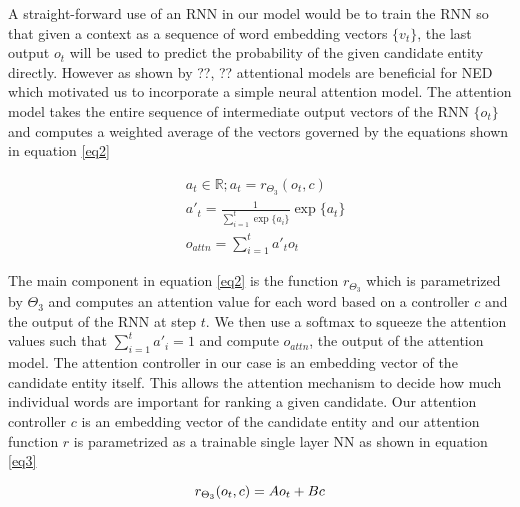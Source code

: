 \documentclass[11pt]{article}
\begin{document}
A straight-forward use of an RNN in our model would be to train the RNN so that given a context as a sequence of word embedding vectors $\{v_t\}$, the last output $o_t$ will be used to predict the probability of the given candidate entity directly. However as shown by ??, ?? attentional models are beneficial for NED which motivated us to incorporate a simple neural attention model. The attention model takes the entire sequence of intermediate output vectors of the RNN $\{o_t\}$ and computes a weighted average of the vectors governed by the equations shown in equation \ref{eq2}

\begin{equation}
	\label{eq2}
	\begin{aligned}
	& a_t \in \mathbb{R}; a_t=r_{\Theta_3}(o_t, c) \\
	& a'_t  = \frac{1}{\sum_{i=1}^{t} \exp\{a_i\}} \exp \{a_t\} \\
	& o_{attn}=\sum_{i=1}^{t} a'_t o_t
	\end{aligned}
\end{equation}

The main component in equation \ref{eq2} is the function $r_{\Theta_3}$ which is parametrized by $\Theta_3$ and computes an attention value for each word based on a controller $c$ and the output of the RNN at step $t$. We then use a softmax to squeeze the attention values such that $\sum_{i=1}^{t} a'_i = 1$ and compute $o_{attn}$, the output of the attention model. The attention controller in our case is an embedding vector of the candidate entity itself. This allows the attention mechanism to decide how much individual words are important for ranking a given candidate. Our attention controller $c$ is an embedding vector of the candidate entity and our attention function $r$ is parametrized as a trainable single layer NN as shown in equation \ref{eq3}

\begin{equation}
\label{eq3}
r_{\Theta_3}(o_t, c) = Ao_t + Bc \\
\end{equation}
\end{document}
